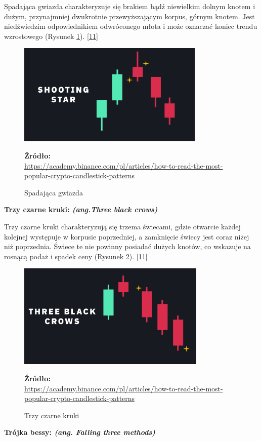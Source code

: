\documentclass[12pt,a4paper,twoside, inzynierska]{pwr_wmat_praca_dyplomowa}
\theoremstyle{plain}
\numberwithin{theorem}{chapter}
\theoremstyle{definition}
\numberwithin{theorem}{chapter}
\begin{document}
	 Spadająca gwiazda charakteryzuje się brakiem bądź niewielkim dolnym knotem i dużym, przynajmniej dwukrotnie przewyższającym korpus, górnym knotem. Jest niedźwiedzim odpowiednikiem odwróconego młota i może oznaczać koniec trendu wzrostowego (Rysunek \ref{fig:spadająca gwiazda}). \hyperref[info11]{[11]}
	\vspace{12pt}
	\begin{figure}[H]
		\centering
		\includegraphics[width=0.5 \textwidth]{Shoting star.png}
		\caption{Spadająca gwiazda}
		\label{fig:spadająca gwiazda}
		\textbf{Źródło:} \\
		\url{https://academy.binance.com/pl/articles/how-to-read-the-most-popular-crypto-candlestick-patterns}
	\end{figure}
	\vspace{12pt}
	\noindent \textbf{Trzy czarne kruki: \textit{(ang.Three black crows)}}
	
	 Trzy czarne kruki charakteryzują się trzema świecami, gdzie otwarcie każdej kolejnej występuje w korpusie poprzedniej, a zamknięcie świecy jest coraz niżej niż poprzednia. Świece te nie powinny posiadać dużych knotów, co wskazuje na rosnącą podaż i spadek ceny (Rysunek \ref{fig:3kroki}). \hyperref[info11]{[11]}
	\vspace{12pt}
	\begin{figure}[H]
		\centering
		\includegraphics[width=0.5 \textwidth]{3kroki.png}
		\caption{Trzy czarne kruki}
		\label{fig:3kroki}
		\textbf{Źródło:} \\
		\url{https://academy.binance.com/pl/articles/how-to-read-the-most-popular-crypto-candlestick-patterns}
	\end{figure}
	\vspace{12pt}
	\noindent \textbf{Trójka bessy: \textit{(ang. Falling three methods)}}
	
\end{document}
